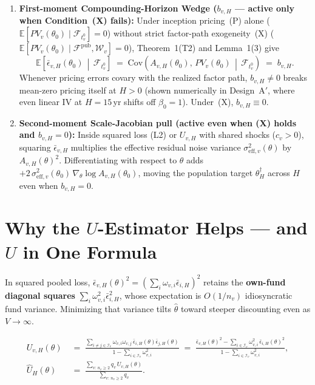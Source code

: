 \documentclass[10.5pt]{article}
\newcommand{\E}{\mathbb{E}}
\newcommand{\Cov}{\mathrm{Cov}}
\newcommand{\F}{\mathcal{F}}
\begin{document}
\begin{enumerate}
  \item \textbf{First-moment Compounding-Horizon Wedge ($b_{v,H}$ — active only when Condition~(X) fails):}
  Under inception pricing~(P) alone ($\E[PV_v(\theta_0)\mid\F_{t_v^0}]=0$) without strict factor-path exogeneity~(X) ($\E[PV_v(\theta_0)\mid\F^{\mathrm{pub}},\mathcal{W}_v]=0$), Theorem~1(T2) and Lemma~1(3) give
  \[
  \E\!\left[\bar\epsilon_{v,H}(\theta_0)\,\middle|\,\F_{t_v^0}\right]
  \;=\; \Cov\!\left(A_{v,H}(\theta_0),\,PV_v(\theta_0)\,\middle|\,\F_{t_v^0}\right)
  \;=\; b_{v,H}.
  \]
  Whenever pricing errors covary with the realized factor path, $b_{v,H}\neq 0$ breaks mean-zero pricing itself at $H>0$ (shown numerically in Design~A$'$, where even linear IV at $H=15$\,yr shifts off $\beta_0=1$). Under~(X), $b_{v,H}\equiv 0$.

  \item \textbf{Second-moment Scale-Jacobian pull (active even when (X) holds and $b_{v,H}=0$):}
  Inside squared loss (L2) or $U_{v,H}$ with shared shocks ($c_v>0$), squaring $\bar\epsilon_{v,H}$ multiplies the effective residual noise variance $\sigma_{\mathrm{eff},v}^2(\theta)$ by $A_{v,H}(\theta)^2$. Differentiating with respect to $\theta$ adds $+2\,\sigma_{\mathrm{eff},v}^2(\theta_0)\,\nabla_\theta\log A_{v,H}(\theta_0)$, moving the population target $\theta_H^\dagger$ across $H$ even when $b_{v,H}=0$.
\end{enumerate}

\section{Why the $U$-Estimator Helps — and $U$ in One Formula}

In squared pooled loss, $\bar\epsilon_{v,H}(\theta)^2 = (\sum_i \omega_{v,i}\bar\epsilon_{i,H})^2$ retains the \textbf{own-fund diagonal squares} $\sum_i \omega_{v,i}^2\bar\epsilon_{i,H}^2$, whose expectation is $O(1/n_v)$ idiosyncratic fund variance. Minimizing that variance tilts $\hat\theta$ toward steeper discounting even as $V\to\infty$.

\begin{keybox}[title={Cross-Fund Pair-Product Estimator ($U_{v,H}$, eligible vintages $n_v \ge 2$)}]
\begin{align*}
U_{v,H}(\theta)
&\;=\; \frac{\sum_{i \neq j \in \mathcal{I}_v}\omega_{v,i}\omega_{v,j}\,\bar\epsilon_{i,H}(\theta)\bar\epsilon_{j,H}(\theta)}{1 - \sum_{i\in\mathcal{I}_v}\omega_{v,i}^2}
\;=\; \frac{\bar\epsilon_{v,H}(\theta)^2 - \sum_{i\in\mathcal{I}_v}\omega_{v,i}^2\,\bar\epsilon_{i,H}(\theta)^2}{1 - \sum_{i\in\mathcal{I}_v}\omega_{v,i}^2}, \\
\widehat U_H(\theta)
&\;=\; \frac{\sum_{v:\,n_v\ge 2} q_v\,U_{v,H}(\theta)}{\sum_{v:\,n_v\ge 2} q_v}.
\end{align*}
\end{keybox}
\end{document}
